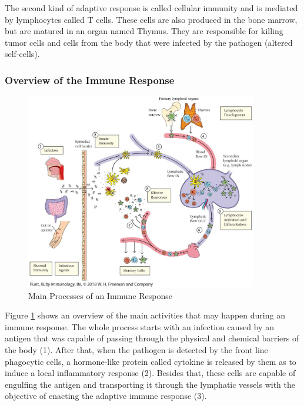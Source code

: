 The second kind of adaptive response is called cellular immunity and is mediated by lymphocytes called T cells. These cells are also produced in the bone marrow, but are matured in an organ named Thymus. They are responsible for killing tumor cells and cells from the body that were infected by the pathogen (altered self-cells).

\subsubsection{Overview of the Immune Response}

\begin{figure}[!h]
	\centering
	\includegraphics[width=0.9\textwidth, keepaspectratio]{img/overview_bis.png}
	\caption{Main Processes of an Immune Response~\cite{Kuby2019}}
	\label{fig:BISOverview}
\end{figure}

Figure \ref{fig:BISOverview} shows an overview of the main activities that may happen during an immune response. The whole process starts with an infection caused by an antigen that was capable of passing through the physical and chemical barriers of the body (1). After that, when the pathogen is detected by the front line phagocytic cells, a hormone-like protein called cytokine is released by them as to induce a local inflammatory response (2). Besides that, these cells are capable of engulfing the antigen and transporting it through the lymphatic vessels with the objective of enacting the adaptive immune response (3).

